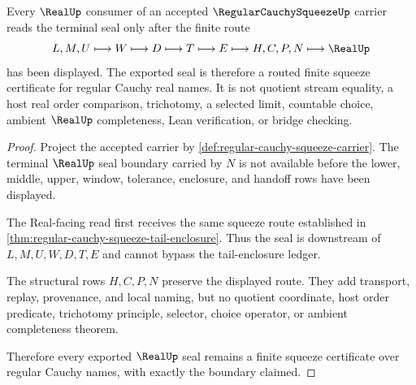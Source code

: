 \begin{theorem}
\label{thm:regular-cauchy-squeeze-real-seal-boundary}
Every $\RealUp$ consumer of an accepted $\RegularCauchySqueezeUp$ carrier reads the terminal seal only after the finite route
$$
L,M,U \longmapsto W \longmapsto D \longmapsto T \longmapsto E \longmapsto H,C,P,N \longmapsto \RealUp
$$
has been displayed. The exported seal is therefore a routed finite squeeze certificate for regular Cauchy real names. It is not quotient stream equality, a host real order comparison, trichotomy, a selected limit, countable choice, ambient $\RealUp$ completeness, Lean verification, or bridge checking.
\end{theorem}
\begin{proof}
Project the accepted carrier by \autoref{def:regular-cauchy-squeeze-carrier}. The terminal $\RealUp$ seal boundary carried by $N$ is not available before the lower, middle, upper, window, tolerance, enclosure, and handoff rows have been displayed.

The Real-facing read first receives the same squeeze route established in \autoref{thm:regular-cauchy-squeeze-tail-enclosure}. Thus the seal is downstream of $L,M,U,W,D,T,E$ and cannot bypass the tail-enclosure ledger.

The structural rows $H,C,P,N$ preserve the displayed route. They add transport, replay, provenance, and local naming, but no quotient coordinate, host order predicate, trichotomy principle, selector, choice operator, or ambient completeness theorem.

Therefore every exported $\RealUp$ seal remains a finite squeeze certificate over regular Cauchy names, with exactly the boundary claimed.
\end{proof}

